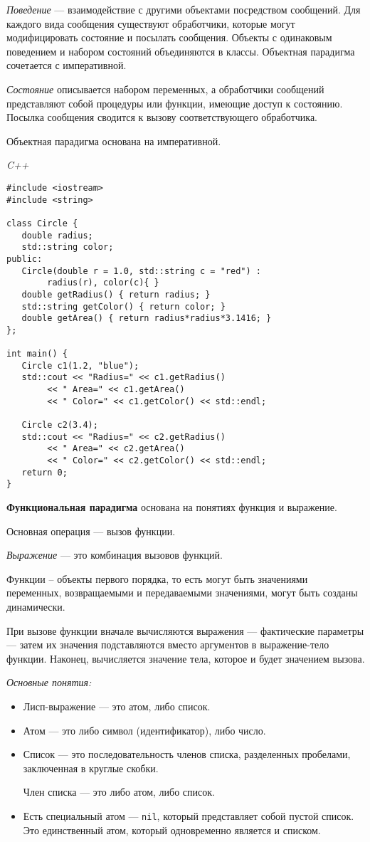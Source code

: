 \textit{Поведение} --- взаимодействие с другими объектами посредством сообщений.
Для каждого вида сообщения существуют обработчики, которые могут модифицировать состояние и посылать сообщения. 
Объекты с одинаковым поведением и набором состояний объединяются в классы.
Объектная парадигма сочетается с императивной.

\textit{Состояние} описывается набором переменных, а обработчики сообщений представляют собой процедуры или функции, имеющие доступ к состоянию.
Посылка сообщения сводится к вызову соответствующего обработчика.

Объектная парадигма основана на императивной.

\textit{C++}
    
\begin{lstlisting}[basicstyle=\ttfamily\small, frame=single]
#include <iostream>
#include <string>
 
class Circle {
   double radius;
   std::string color;
public:
   Circle(double r = 1.0, std::string c = "red") :
        radius(r), color(c){ }
   double getRadius() { return radius; }
   std::string getColor() { return color; }
   double getArea() { return radius*radius*3.1416; }
};
 
int main() {
   Circle c1(1.2, "blue");
   std::cout << "Radius=" << c1.getRadius()
        << " Area=" << c1.getArea()
        << " Color=" << c1.getColor() << std::endl;
 
   Circle c2(3.4);
   std::cout << "Radius=" << c2.getRadius()
        << " Area=" << c2.getArea()
        << " Color=" << c2.getColor() << std::endl;
   return 0;
}
\end{lstlisting}
    
\bigbreak
\textbf{Функциональная парадигма} основана на понятиях функция и выражение.

Основная операция --- вызов функции.

\textit{Выражение} --- это комбинация вызовов функций. 

Функции -- объекты первого порядка, то есть могут быть значениями переменных, возвращаемыми и передаваемыми значениями, могут быть созданы динамически.

При вызове функции вначале вычисляются выражения --- фактические параметры --- затем их значения подставляются вместо аргументов в выражение-тело функции.
Наконец, вычисляется значение тела, которое и будет значением вызова.

\textit{Основные понятия:}
\begin{itemize}
    \item Лисп-выражение --- это атом, либо список.
    \item Атом --- это либо символ (идентификатор), либо число.
    \item Список --- это последовательность членов списка, разделенных пробелами, заключенная в круглые скобки.
    
    Член списка — это либо атом, либо список.
    \item Есть специальный атом --- \texttt{nil}, который представляет собой пустой список. 
    Это единственный атом, который одновременно является и списком.
\end{itemize}

